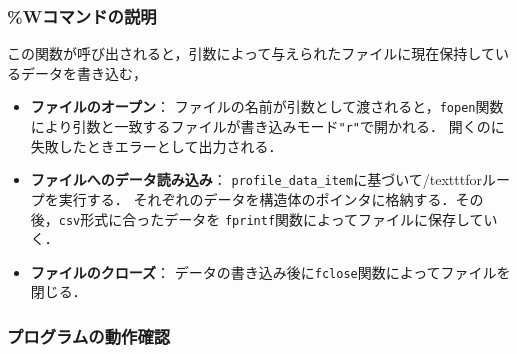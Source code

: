     \subsubsection{\%Wコマンドの説明}
    この関数が呼び出されると，引数によって与えられたファイルに現在保持しているデータを書き込む，
    
    \begin{itemize}
      \item\textbf{ファイルのオープン}：
      ファイルの名前が引数として渡されると，\texttt{fopen}関数により引数と一致するファイルが書き込みモード\texttt{"r"}で開かれる．
      開くのに失敗したときエラーとして出力される．
      \item\textbf{ファイルへのデータ読み込み}：
      \texttt{profile\_data\_item}に基づいて/texttt{for}ループを実行する．
      それぞれのデータを構造体のポインタに格納する．その後，\texttt{csv}形式に合ったデータを
      \texttt{fprintf}関数によってファイルに保存していく．
      \item \textbf{ファイルのクローズ}：
      データの書き込み後に\texttt{fclose}関数によってファイルを閉じる．


    \end{itemize}
    \subsubsection{プログラムの動作確認}

